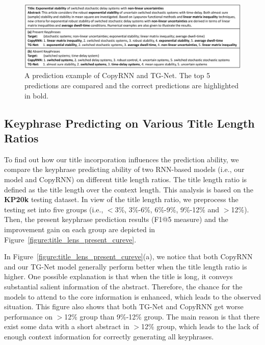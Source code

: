 \documentclass[letterpaper]{article} %
\begin{document}
\begin{figure}
\centering
\includegraphics[width=6.9in]{figures/PaperID3210_TGNet_final_case_study_cmyk.pdf}
\caption{A prediction example of CopyRNN and TG-Net. The top 5 predictions are compared and the correct predictions are highlighted in bold.}
\label{figure:case_study}
\end{figure}

\subsection{Keyphrase Predicting on Various Title Length Ratios}
To find out how our title incorporation influences the prediction ability, we compare the keyphrase predicting ability of two RNN-based models (i.e., our model and CopyRNN) on different title length ratios. The title length ratio is defined as the title length over the context length. This analysis is based on the \textbf{KP20k} testing dataset. In view of the title length ratio, we preprocess the testing set into five groups (i.e., $<$3\%, 3\%-6\%, 6\%-9\%, 9\%-12\% and $>$12\%). Then, the present keyphrase prediction results (F1@5 measure) and the improvement gain on each group are depicted in Figure~\ref{figure:title_lens_present_cureve}. 


In Figure~\ref{figure:title_lens_present_cureve}(a), we notice that both CopyRNN and our TG-Net model generally perform better when the title length ratio is higher. One possible explanation is that when the title is long, it conveys substantial salient information of the abstract. Therefore, the chance for the models to attend to the core information is enhanced, which leads to the observed situation. This figure also shows that both TG-Net and CopyRNN get worse performance on $>$12\% group than 9\%-12\% group. The main reason is that there exist some data with a short abstract in $>$12\% group, which leads to the lack of enough context information for correctly generating all keyphrases.
\end{document}
